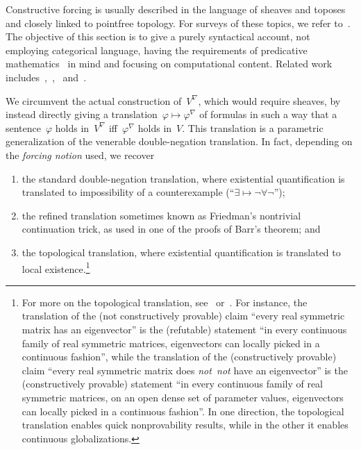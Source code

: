 \documentclass[com,11pt,crcready]{iosart2x}
\theoremstyle{definition}
\theoremstyle{plain}
\theoremstyle{remark}
\renewcommand{\_}{\mathpunct{.}\,}
\begin{document}
Constructive forcing is usually described in the language of sheaves and
toposes~\cite{palmgren:css,grayson:forcing,streicher:forcing,yamamoto:forcing,scedrov:forcing,tierney:forcing,blass-scedrov:forcing,roberts:class-forcing}
and closely linked to pointfree topology. For surveys of these topics, we
refer to~\cite{blechschmidt:generalized-spaces,johnstone:art,johnstone:point,vickers:continuity,vickers:locales-toposes,belanger-marquis:pointless,johnstone:baby-elephant}.
The objective of this section is to give a purely syntactical account, not
employing categorical language, having the requirements of predicative
mathematics~\cite{maietti:au,vickers:sketches,crosilla:predicativity} in mind
and focusing
on computational content. Related work
includes~\cite[Section~2.4]{avigad:forcing},~\cite{coquand:goodman},~\cite[Section~2.3]{renardel-de-lavalette:bi}
and~\cite{sato:forcing}.

We circumvent the actual construction of~$V^\nabla$, which would require sheaves, by
instead directly giving a translation~$\varphi \mapsto \varphi^\nabla$ of
formulas in such a way that a sentence~$\varphi$ holds in~$V^\nabla$
iff~$\varphi^\nabla$ holds in~$V$. This translation is a parametric
generalization of the venerable double-negation translation. In fact, depending
on the \emph{forcing notion} used, we recover
\begin{enumerate}
\item[(1)] the standard double-negation translation, where
existential quantification is translated to impossibility of a counterexample
(``$\exists \mapsto \neg\forall\neg$'');
\item[(2)] the refined translation sometimes known as Friedman's nontrivial
continuation trick, as used in one of the proofs of Barr's theorem; and
\item[(3)] the topological translation, where existential quantification is
translated to local existence.\footnote{For more on the topological
translation, see~\cite[Section~4.3]{blechschmidt:filmat}
or~\cite[Section~2.4]{blechschmidt:generalized-spaces}. For instance, the
translation of the (not constructively provable) claim ``every real symmetric
matrix has an eigenvector'' is the (refutable) statement ``in every continuous
family of real symmetric matrices, eigenvectors can locally picked in a
continuous fashion'', while the translation of the (constructively provable)
claim ``every real symmetric matrix does \emph{not~not} have an eigenvector''
is the (constructively provable) statement ``in every continuous family of real
symmetric matrices, on an open dense set of parameter values, eigenvectors can
locally picked in a continuous fashion''. In one direction, the topological
translation enables quick nonprovability results, while in the other it enables
continuous globalizations.}
\end{enumerate}
\end{document}
